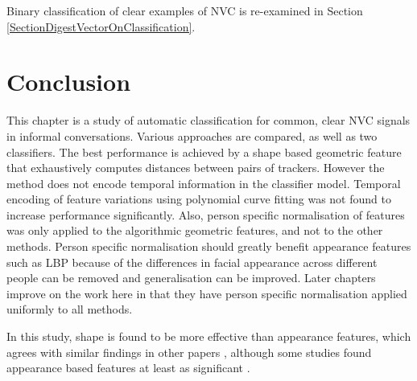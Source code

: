 Binary classification of clear examples of \ac{NVC} is re-examined in Section \ref{SectionDigestVectorOnClassification}. 

\section{Conclusion}

This chapter is a study of automatic classification for common, clear \ac{NVC} signals in informal conversations. Various \featureGeneration approaches are compared, as well as two classifiers. The best performance is achieved by a shape based geometric feature that exhaustively computes distances between pairs of trackers. 
However the method does not encode temporal information in the classifier model. Temporal encoding of feature variations using polynomial curve fitting was not found to increase performance significantly. Also, person specific normalisation of features was only applied to the algorithmic geometric features, and not to the other \featureGeneration methods. Person specific normalisation should greatly benefit appearance features such as \ac{LBP} because of the differences in facial appearance across different people can be removed and generalisation can be improved. Later chapters improve on the work here in that they have person specific normalisation applied uniformly to all \featureGeneration methods.

In this study, shape is found to be more effective than appearance features, which agrees with similar findings in other papers \cite{Akakin2011} \cite{Lucey2009}, although some studies found appearance based features at least as significant \cite{Luettin1996} \cite{Valstar2011slides}. 

